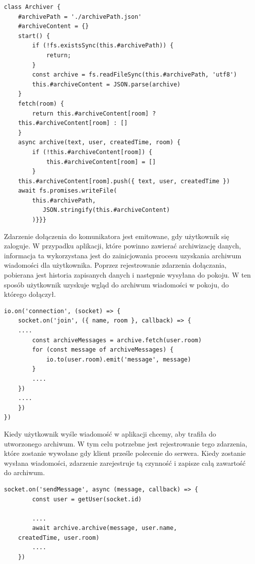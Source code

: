 \begin{lstlisting}[caption=Implementacja funkcji archiwizującej wiadomości w komunikatorze]
class Archiver {
    #archivePath = './archivePath.json'
    #archiveContent = {}
    start() {
        if (!fs.existsSync(this.#archivePath)) {
            return;
        }
        const archive = fs.readFileSync(this.#archivePath, 'utf8')
        this.#archiveContent = JSON.parse(archive)
    }
    fetch(room) {
        return this.#archiveContent[room] ? 
	this.#archiveContent[room] : []
    }
    async archive(text, user, createdTime, room) {
        if (!this.#archiveContent[room]) {
            this.#archiveContent[room] = []
        }
    this.#archiveContent[room].push({ text, user, createdTime })
    await fs.promises.writeFile(
    	this.#archivePath,
           JSON.stringify(this.#archiveContent)
        )}}}
\end{lstlisting}
Zdarzenie dołączenia do komunikatora jest emitowane, gdy użytkownik się zaloguje. W przypadku aplikacji, które powinno zawierać archiwizację danych, informacja ta wykorzystana jest do zainicjowania procesu uzyskania archiwum wiadomości dla użytkownika. Poprzez rejestrowanie zdarzenia dołączania, pobierana jest historia zapisanych danych i  następnie wysyłana do pokoju. W ten sposób użytkownik uzyskuje wgląd do archiwum wiadomości w pokoju, do którego dołączył.
\newpage
\begin{lstlisting}[caption={Wykorzystanie zdarzenia dołączenia, aby uzyskać widok zawartości archiwum w aplikacji}]
io.on('connection', (socket) => {
    socket.on('join', ({ name, room }, callback) => {
	....
        const archiveMessages = archive.fetch(user.room)
        for (const message of archiveMessages) {
            io.to(user.room).emit('message', message)
        }
        ....
    })
   	....
    })
})
\end{lstlisting}
Kiedy użytkownik wyśle wiadomość w aplikacji chcemy, aby trafiła do utworzonego archiwum. W tym celu potrzebne jest rejestrowanie tego zdarzenia, które zostanie wywołane gdy klient prześle polecenie do serwera. Kiedy zostanie wysłana wiadomości, zdarzenie zarejestruje tą czynność i zapisze całą zawartość do archiwum. 
\begin{lstlisting}[caption=Wykorzystanie zdarzenia wysyłania wiadomości do tworzenia archiwum]
socket.on('sendMessage', async (message, callback) => {
        const user = getUser(socket.id)

      	....
        await archive.archive(message, user.name, 
	createdTime, user.room)
       	....
    })
\end{lstlisting}






